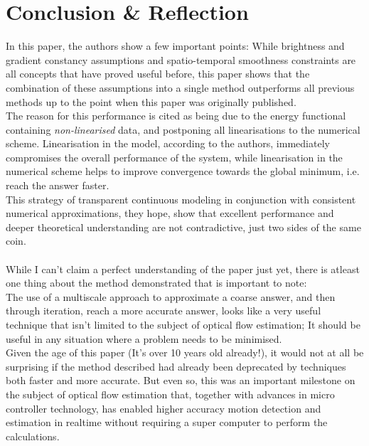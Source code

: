 \documentclass{article}
\begin{document}
\section{Conclusion \& Reflection}
\label{sc:conclusion}
In this paper, the authors show a few important points: While brightness and gradient constancy assumptions and spatio-temporal smoothness constraints are all concepts that have proved useful before, this paper shows that the combination of these assumptions into a single method outperforms all previous methods up to the point when this paper was originally published.\\
The reason for this performance is cited as being due to the energy functional containing \textit{non-linearised} data, and postponing all linearisations to the numerical scheme. Linearisation in the model, according to the authors, immediately compromises the overall performance of the system, while linearisation in the numerical scheme helps to improve convergence towards the global minimum, i.e. reach the answer faster.\\
This strategy of transparent continuous modeling in conjunction with consistent numerical approximations, they hope, show that excellent performance and deeper theoretical understanding are not contradictive, just two sides of the same coin.
\\
\\
While I can't claim a perfect understanding of the paper just yet, there is atleast one thing about the method demonstrated that is important to note:\\
The use of a multiscale approach to approximate a coarse answer, and then through iteration, reach a more accurate answer, looks like a very useful technique that isn't limited to the subject of optical flow estimation; It should be useful in any situation where a problem needs to be minimised.\\
Given the age of this paper (It's over 10 years old already!), it would not at all be surprising if the method described had already been deprecated by techniques both faster and more accurate. But even so, this was an important milestone on the subject of optical flow estimation that, together with advances in micro controller technology, has enabled higher accuracy motion detection and estimation in realtime without requiring a super computer to perform the calculations.


\end{document}
